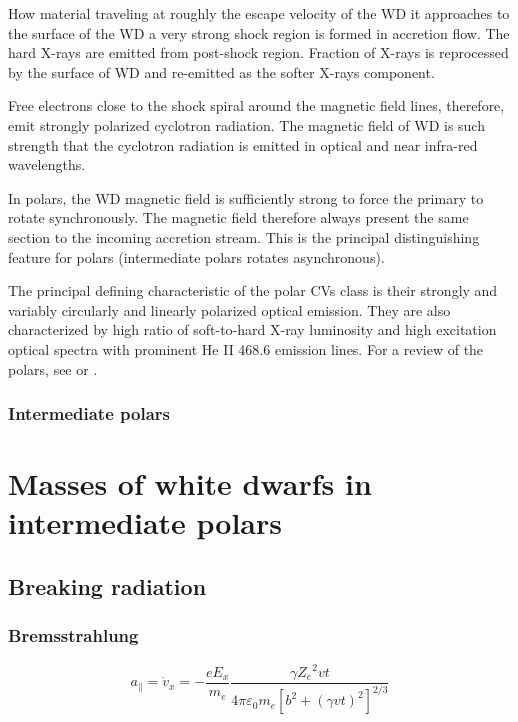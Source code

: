 \documentclass[oneside,a4paper,11pt]{report}
\begin{document}
How material traveling at roughly the escape velocity of the WD it approaches to the surface of the WD a very strong shock 
region is formed in accretion flow. The hard X-rays are emitted from post-shock region. Fraction of X-rays is reprocessed 
by the surface of WD and re-emitted as the softer X-rays component. 

Free electrons close to the shock spiral around the magnetic field lines, therefore, emit strongly polarized 
cyclotron radiation. The magnetic field of WD is such strength that the cyclotron radiation is emitted in optical and 
near infra-red wavelengths.               

In polars, the WD magnetic field is sufficiently strong to force the primary to rotate synchronously. The magnetic field 
therefore always present the same section to the incoming accretion stream. This is the principal distinguishing feature 
for polars (intermediate polars rotates asynchronous).   

The principal defining characteristic of the polar CVs class is their strongly and variably circularly 
and linearly polarized optical emission. They are also characterized by high ratio of soft-to-hard X-ray 
luminosity and high excitation optical spectra with prominent He II 468.6 emission lines. For a review of the polars, see \citet{1990SSRv...54..195C}
or \citet{warner:1}.  

\subsection{Intermediate polars}



\chapter{Masses of white dwarfs in intermediate polars}
\section{Breaking radiation}
\subsection{Bremsstrahlung}
\begin{equation}
 a_{\parallel} = \dot{v}_x = -\frac{eE_x}{m_e}\frac{\gamma {Z_e}^2 vt}{4\pi \varepsilon_0 m_e \left [ b^2 + \left ( \gamma vt \right )^2  \right ]^{2/3}} 
\end{equation}
\end{document}
